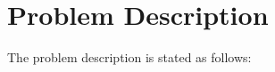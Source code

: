 %
%
%


\section{Problem Description}
%
%
The problem description \cite{1dv607:workshop1-instructions} is stated as
follows:


